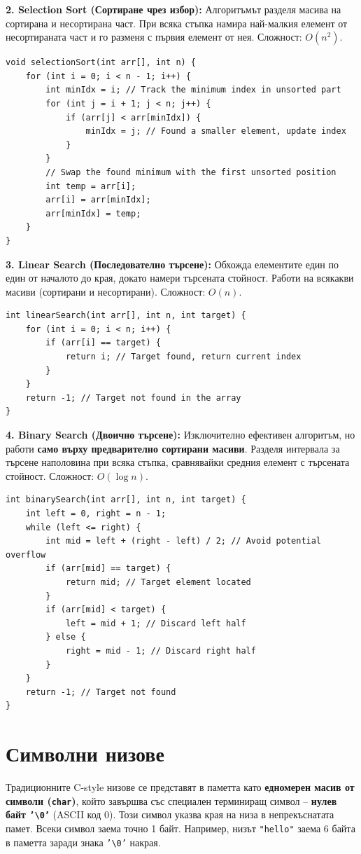 \documentclass{scrartcl}
\begin{document}
\begin{FlushLeft}
\textbf{2. Selection Sort (Сортиране чрез избор):} Алгоритъмът разделя масива на сортирана и несортирана част. При всяка стъпка намира най-малкия елемент от несортираната част и го разменя с първия елемент от нея. Сложност: $O(n^2)$.
\begin{lstlisting}
void selectionSort(int arr[], int n) {
    for (int i = 0; i < n - 1; i++) {
        int minIdx = i; // Track the minimum index in unsorted part
        for (int j = i + 1; j < n; j++) {
            if (arr[j] < arr[minIdx]) {
                minIdx = j; // Found a smaller element, update index
            }
        }
        // Swap the found minimum with the first unsorted position
        int temp = arr[i];
        arr[i] = arr[minIdx];
        arr[minIdx] = temp;
    }
}
\end{lstlisting}

\textbf{3. Linear Search (Последователно търсене):} Обхожда елементите един по един от началото до края, докато намери търсената стойност. Работи на всякакви масиви (сортирани и несортирани). Сложност: $O(n)$.
\begin{lstlisting}
int linearSearch(int arr[], int n, int target) {
    for (int i = 0; i < n; i++) {
        if (arr[i] == target) {
            return i; // Target found, return current index
        }
    }
    return -1; // Target not found in the array
}
\end{lstlisting}

\textbf{4. Binary Search (Двоично търсене):} Изключително ефективен алгоритъм, но работи \textbf{само върху предварително сортирани масиви}. Разделя интервала за търсене наполовина при всяка стъпка, сравнявайки средния елемент с търсената стойност. Сложност: $O(\log n)$.
\begin{lstlisting}
int binarySearch(int arr[], int n, int target) {
    int left = 0, right = n - 1;
    while (left <= right) {
        int mid = left + (right - left) / 2; // Avoid potential overflow
        if (arr[mid] == target) {
            return mid; // Target element located
        }
        if (arr[mid] < target) {
            left = mid + 1; // Discard left half
        } else {
            right = mid - 1; // Discard right half
        }
    }
    return -1; // Target not found
}
\end{lstlisting}

\section{Символни низове}
Традиционните C-style низове се представят в паметта като \textbf{едномерен масив от символи (\texttt{char})}, който завършва със специален терминиращ символ – \textbf{нулев байт \texttt{'\textbackslash0'}} (ASCII код 0). Този символ указва края на низа в непрекъснатата памет. Всеки символ заема точно 1 байт. Например, низът \texttt{"hello"} заема 6 байта в паметта заради знака \texttt{'\textbackslash0'} накрая.


\end{FlushLeft}
\end{document}

